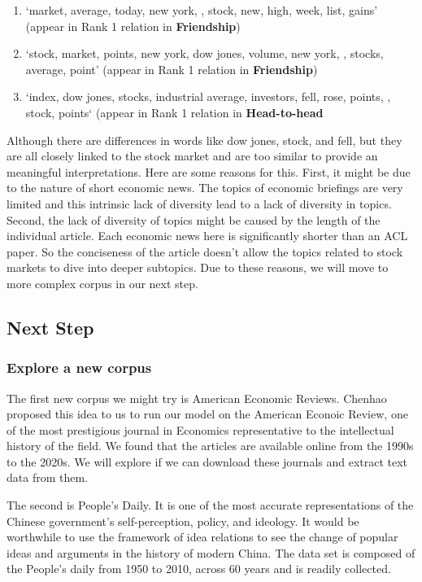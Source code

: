 \documentclass[11pt,a4paper]{article}
\newcommand\boldfriend[1]{\textcolor{green(html/cssgreen)}{\textbf{#1}}}
\newcommand\boldhead[1]{\textcolor{red-brown}{\textbf{#1}}}
\begin{document}
\begin{enumerate}
    \item `market, average, today, new york, , stock, new, high, week, list, gains' (appear in Rank 1 relation in \boldfriend{Friendship})
    \item `stock, market, points, new york, dow jones, volume, new york, , stocks, average, point' (appear in Rank 1 relation in \boldfriend{Friendship})
    \item `index, dow jones, stocks, industrial average, investors, fell, rose, points, , stock, points` (appear in Rank 1 relation in \boldhead{Head-to-head}
\end{enumerate}

Although there are differences in words like dow jones, stock, and fell, but they are all closely linked to the stock market and are too similar to provide an meaningful interpretations. Here are some reasons for this. 
First, it might be due to the nature of short economic news. The topics of economic briefings are very limited and this intrinsic lack of diversity lead to a lack of diversity in topics. Second, the lack of diversity of topics might be caused by the length of the individual article. Each economic news here is significantly shorter than an ACL paper. So the conciseness of the article doesn't allow the topics related to stock markets to dive into deeper subtopics. Due to these reasons, we will move to more complex corpus in our next step.

\subsection{Next Step}
\subsubsection{Explore a new corpus}

The first new corpus we might try is American Economic Reviews. Chenhao proposed this idea to us to run our model on the American Econoic Review, one of the most prestigious journal in Economics representative to the intellectual history of the field. We found that the articles are available online from the 1990s to the 2020s. We will explore if we can download these journals and extract text data from them. 

The second is People’s Daily. It is one of the most accurate representations of the Chinese government’s self-perception, policy, and ideology. It would be worthwhile to use the framework of idea relations to see the change of popular ideas and arguments in the history of modern China. The data set is composed of the People’s daily from 1950 to 2010, across 60 years and is readily collected.
\end{document}
